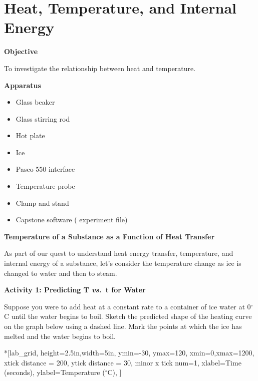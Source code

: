 
\section{Heat, Temperature, and Internal Energy}

\makelabheader %

\textbf{Objective}

To investigate the relationship between heat and temperature.

\textbf{Apparatus}

\begin{itemize}
\item Glass beaker 
\item Glass stirring rod
\item Hot plate
\item Ice
\item Pasco 550 interface
\item Temperature probe
\item Clamp and stand
\item Capstone software ( experiment file)
\end{itemize}
\textbf{Temperature of a Substance as a Function of Heat Transfer}

As part of our quest to understand heat energy transfer, temperature,
and internal energy of a substance, let's consider the temperature
change as ice is changed to water and then to steam.

\textbf{Activity 1: Predicting T \textit{vs.}~t for Water} 

Suppose you were to add heat at a constant rate to a container of
ice water at 0\( ^{\circ } \)C until the water begins to boil. Sketch
the predicted shape of the heating curve on the graph below using
a dashed line. Mark the points at which the ice has melted and the
water begins to boil.


\begin{lab_axis}*[lab_grid,
	height=2.5in,width=5in,
	ymin=-30, ymax=120,
	xmin=0,xmax=1200,
	xtick distance = 200,
	ytick distance = 30,
	minor x tick num=1,
	xlabel=Time (seconds),
	ylabel=Temperature ($^\circ$C),
]
\end{lab_axis}


